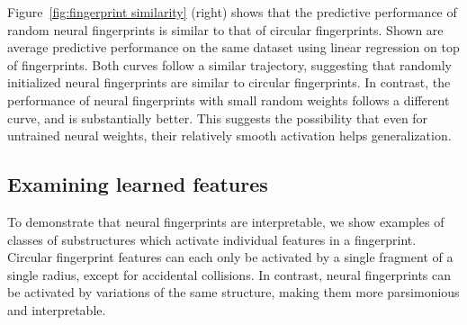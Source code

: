 \documentclass{article}
\begin{document}
Figure~\ref{fig:fingerprint similarity} (right) shows that the predictive performance of random neural fingerprints is similar to that of circular fingerprints.
Shown are average predictive performance on the same dataset using linear regression on top of fingerprints.
Both curves follow a similar trajectory, suggesting that randomly initialized neural fingerprints are similar to circular fingerprints.
In contrast, the performance of neural fingerprints with small random weights follows a different curve, and is substantially better.
This suggests the possibility that even for untrained neural weights, their relatively smooth activation helps generalization.

\subsection{Examining learned features}
To demonstrate that neural fingerprints are interpretable, we show examples of classes of substructures which activate individual features in a fingerprint.
Circular fingerprint features can each only be activated by a single fragment of a single radius, except for accidental collisions.
In contrast, neural fingerprints can be activated by variations of the same structure, making them more parsimonious and interpretable.
\end{document}
